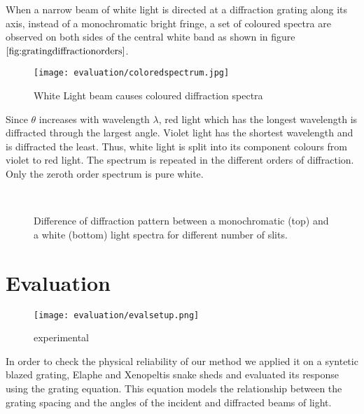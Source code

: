 When a narrow beam of white light is directed at a diffraction grating along its axis, instead of a monochromatic bright fringe, a set of coloured spectra are observed on both sides of the central white band as shown in figure $\ref{fig:gratingdiffractionorders}$.

\begin{figure}[H]
  \centering
  \texttt{[image: evaluation/coloredspectrum.jpg]}
  \label{fig:diffractionSpectrum}
  \caption{White Light beam causes coloured diffraction spectra}
\end{figure}

Since $\theta$ increases with wavelength $\lambda$, red light which has the longest wavelength is diffracted through the largest angle. Violet light has the shortest wavelength and is diffracted the least. Thus, white light is split into its component colours from violet to red light. The spectrum is repeated in the different orders of diffraction. Only the zeroth order spectrum is pure white.

\begin{figure}[H]
  \centering
~
~
~
  
  \label{fig:diffractionSlits}
  \caption{Difference of diffraction pattern between a monochromatic (top) and a white (bottom) light spectra for different number of slits.}
\end{figure}

\section{Evaluation}

\begin{figure}[H]
  \centering
  \texttt{[image: evaluation/evalsetup.png]}
  \caption{experimental}
  \label{fig:experimentalsetup}
\end{figure}

In order to check the physical reliability of our method we applied it on a syntetic blazed grating, Elaphe and Xenopeltis snake sheds and evaluated its response using the grating equation. This equation models the relationship between the grating spacing and the angles of the incident and diffracted beams of light. 

